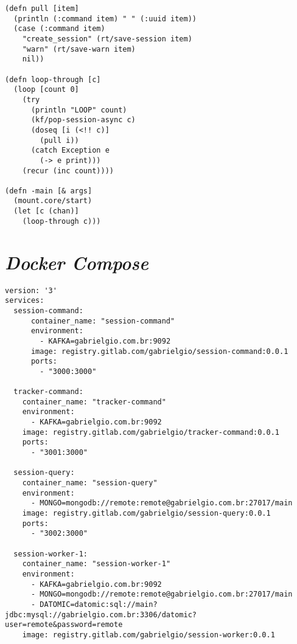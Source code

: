 \begin{apendicesenv}
\begin{lstlisting}
(defn pull [item]
  (println (:command item) " " (:uuid item))
  (case (:command item)
    "create_session" (rt/save-session item)
    "warn" (rt/save-warn item)
    nil))

(defn loop-through [c]
  (loop [count 0]
    (try
      (println "LOOP" count)
      (kf/pop-session-async c)
      (doseq [i (<!! c)]
        (pull i))
      (catch Exception e
        (-> e print)))
    (recur (inc count))))

(defn -main [& args]
  (mount.core/start)
  (let [c (chan)]
    (loop-through c)))
\end{lstlisting}

\chapter{\textit{Docker Compose}}
\label{ap:dockercompose}
\begin{lstlisting}
version: '3'
services:
  session-command:
      container_name: "session-command"
      environment:
        - KAFKA=gabrielgio.com.br:9092
      image: registry.gitlab.com/gabrielgio/session-command:0.0.1
      ports:
        - "3000:3000"

  tracker-command:
    container_name: "tracker-command"
    environment:
      - KAFKA=gabrielgio.com.br:9092
    image: registry.gitlab.com/gabrielgio/tracker-command:0.0.1
    ports:
      - "3001:3000"

  session-query:
    container_name: "session-query"
    environment:
      - MONGO=mongodb://remote:remote@gabrielgio.com.br:27017/main
    image: registry.gitlab.com/gabrielgio/session-query:0.0.1
    ports:
      - "3002:3000"

  session-worker-1:
    container_name: "session-worker-1"
    environment:
      - KAFKA=gabrielgio.com.br:9092
      - MONGO=mongodb://remote:remote@gabrielgio.com.br:27017/main
      - DATOMIC=datomic:sql://main?jdbc:mysql://gabrielgio.com.br:3306/datomic?user=remote&password=remote
    image: registry.gitlab.com/gabrielgio/session-worker:0.0.1
\end{lstlisting}


\end{apendicesenv}